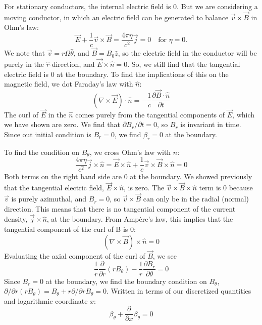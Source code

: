\documentclass[letterpaper]{article}
\begin{document}
For stationary conductors, the internal electric field is 0. But we
are considering a moving conductor, in which an electric field can be
generated to balance $\vec{v}\times\vec{B}$ in Ohm's law:
\begin{equation}
\vec{E} + \frac{1}{c}\vec{v}\times\vec{B}=\frac{4\pi\eta}{c^2}\vec{j}=0
\quad\text{for $\eta=0$.}
\end{equation}
We note that $\vec{v}=r\Omega\hat{\theta}$, and $\vec{B}=B_0\hat{z}$,
so the electric field in the conductor will be purely in the
$\hat{r}$-direction, and $\vec{E}\times\hat{n}=0$. So, we still find
that the tangential electric field is 0 at the boundary. To find the
implications of this on the magnetic field, we dot Faraday's law with
$\hat{n}$:
\begin{equation}
\left(\nabla\times\vec{E}\right)\cdot\hat{n} = 
-\frac{1}{c}\frac{\partial\vec{B}\cdot\hat{n}}{\partial t}
\end{equation}
The curl of $\vec{E}$ in the $\hat{n}$ comes purely from the
tangential components of $\vec{E}$, which we have shown are zero. We
find that $\partial B_r/\partial t = 0$, so $B_r$ is invariant in
time. Since out initial condition is $B_r=0$, we find $\beta_r=0$ at
the boundary.

To find the condition on $B_\theta$, we cross Ohm's law with $\hat{n}$:
\begin{equation}
\frac{4\pi\eta}{c^2}\vec{j}\times\hat{n} = \vec{E}\times\hat{n} +
 \frac{1}{c}\vec{v}\times\vec{B}\times\hat{n}=0
\end{equation}
Both terms on the right hand side are 0 at the boundary. We showed
previously that the tangential electric field, $\vec{E}\times\hat{n}$,
is zero. The $\vec{v}\times\vec{B}\times\hat{n}$ term is 0 because
$\vec{v}$ is purely azimuthal, and $B_r=0$, so $\vec{v}\times\vec{B}$
can only be in the radial (normal) direction. This means that there is
no tangential component of the current density,
$\vec{j}\times\hat{n}$, at the boundary. From Amp\`{e}re's law, this
implies that the tangential component of the curl of B is 0:
\begin{equation}
\left(\nabla\times\vec{B}\right)\times\hat{n} = 0
\end{equation}
Evaluating the axial component of the curl of $\vec{B}$, we see
\begin{equation}
\frac{1}{r}\frac{\partial}{\partial r}\left(r B_\theta \right)
 - \frac{1}{r}\frac{\partial B_r}{\partial \theta} = 0
\end{equation}
Since $B_r=0$ at the boundary, we find the boundary condition on
$B_\theta$, $\partial/\partial r (rB_\theta)= B_\theta +
r\partial/\partial r B_\theta = 0$.  Written in terms of our discretized
quantities and logarithmic coordinate $x$:
\begin{equation}
\beta_\theta + \frac{\partial}{\partial x}\beta_\theta = 0
\end{equation}
\end{document}
